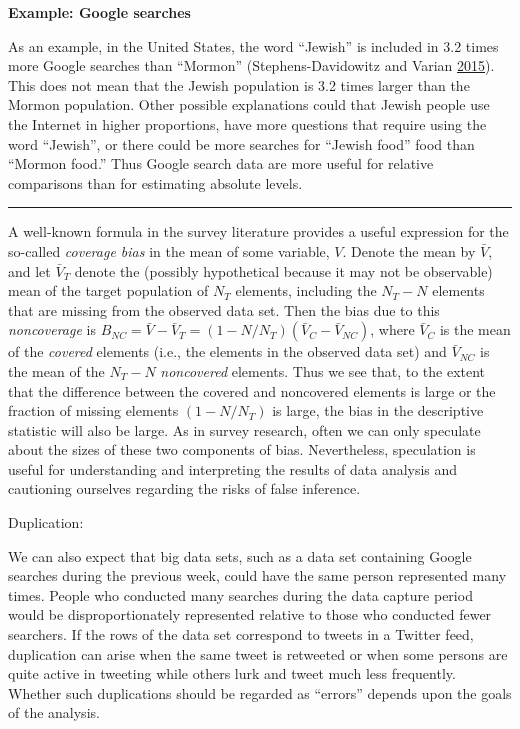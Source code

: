 \documentclass[]{krantz}
\begin{document}
\textbf{Example: Google searches}

As an example, in the United States, the word ``Jewish'' is included in
3.2 times more Google searches than ``Mormon'' (Stephens-Davidowitz and
Varian \protect\hyperlink{ref-SDV2015}{2015}). This does not mean that
the Jewish population is 3.2 times larger than the Mormon population.
Other possible explanations could that Jewish people use the Internet in
higher proportions, have more questions that require using the word
``Jewish'', or there could be more searches for ``Jewish food'' food
than ``Mormon food.'' Thus Google search data are more useful for
relative comparisons than for estimating absolute levels.

\begin{center}\rule{0.5\linewidth}{\linethickness}\end{center}

A well-known formula in the survey literature provides a useful
expression for the so-called \emph{coverage bias} in the mean of some
variable, \(V\). Denote the mean by \(\bar{V}\), and let \(\bar{V}_T\)
denote the (possibly hypothetical because it may not be observable) mean
of the target population of \(N_{T}\) elements, including the
\(N_{T}-N\) elements that are missing from the observed data set. Then
the bias due to this \emph{noncoverage} is
\(B_{NC} = \bar{V} - \bar{V}_T = (1 - N / N_T )(\bar{V}_C - \bar{V}_{NC})\),
where \(\bar{V}_C\) is the mean of the \emph{covered} elements (i.e.,
the elements in the observed data set) and \(\bar{V}_{NC}\) is the mean
of the \(N_{T}-N\) \emph{noncovered} elements. Thus we see that, to the
extent that the difference between the covered and noncovered elements
is large or the fraction of missing elements \((1 - N / N_T)\) is large,
the bias in the descriptive statistic will also be large. As in survey
research, often we can only speculate about the sizes of these two
components of bias. Nevertheless, speculation is useful for
understanding and interpreting the results of data analysis and
cautioning ourselves regarding the risks of false inference.

Duplication:

We can also expect that big data sets, such as a data set containing
Google searches during the previous week, could have the same person
represented many times. People who conducted many searches during the
data capture period would be disproportionately represented relative to
those who conducted fewer searchers. If the rows of the data set
correspond to tweets in a Twitter feed, duplication can arise when the
same tweet is retweeted or when some persons are quite active in
tweeting while others lurk and tweet much less frequently. Whether such
duplications should be regarded as ``errors'' depends upon the goals of
the analysis.
\end{document}
